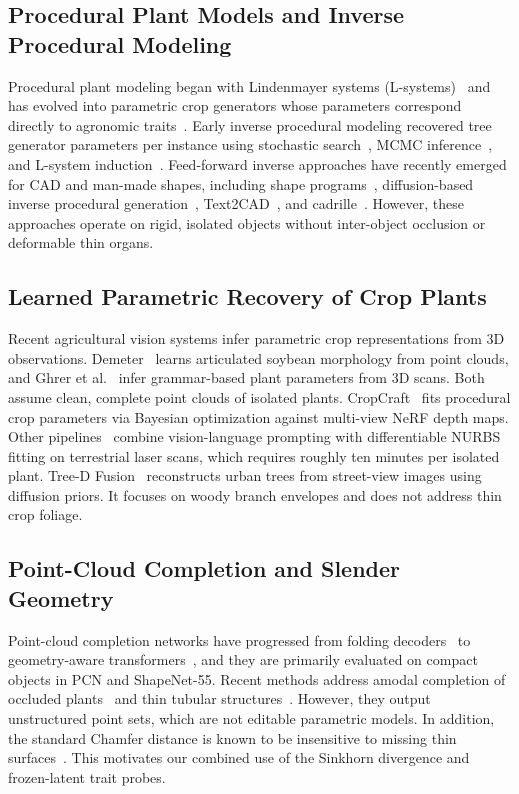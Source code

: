\documentclass[10pt,twocolumn,letterpaper]{article}
\begin{document}
\subsection{Procedural Plant Models and Inverse Procedural Modeling}
Procedural plant modeling began with Lindenmayer systems (L-systems)~\citep{prusin1990abop} and has evolved into parametric crop generators whose parameters correspond directly to agronomic traits~\citep{floraforge2026,hadadi2025procmaize}. Early inverse procedural modeling recovered tree generator parameters per instance using stochastic search~\citep{stava2014ipmtrees}, MCMC inference~\citep{talton2011metropolis}, and L-system induction~\citep{guo2020ipmlsys,latentlsys2023}. Feed-forward inverse approaches have recently emerged for CAD and man-made shapes, including shape programs~\citep{shapeprograms2019}, diffusion-based inverse procedural generation~\citep{zhao2025dipcg}, Text2CAD~\citep{text2cad2024}, and cadrille~\citep{kolodiazhnyi2025cadrille}. However, these approaches operate on rigid, isolated objects without inter-object occlusion or deformable thin organs.

\subsection{Learned Parametric Recovery of Crop Plants}
Recent agricultural vision systems infer parametric crop representations from 3D observations. Demeter~\citep{demeter2025} learns articulated soybean morphology from point clouds, and Ghrer et al.~\citep{ghrer2025paramplants} infer grammar-based plant parameters from 3D scans. Both assume clean, complete point clouds of isolated plants. CropCraft~\citep{cropcraft2026} fits procedural crop parameters via Bayesian optimization against multi-view NeRF depth maps. Other pipelines~\citep{hadadi2026vlmmaize,hadadi2025procmaize,nurbsdiff2022} combine vision-language prompting with differentiable NURBS fitting on terrestrial laser scans, which requires roughly ten minutes per isolated plant. Tree-D Fusion~\citep{lee2024treedfusion} reconstructs urban trees from street-view images using diffusion priors. It focuses on woody branch envelopes and does not address thin crop foliage.

\subsection{Point-Cloud Completion and Slender Geometry}
Point-cloud completion networks have progressed from folding decoders~\citep{yuan2018pcn} to geometry-aware transformers~\citep{yu2021pointr,yu2023adapointr,cai2024einet}, and they are primarily evaluated on compact objects in PCN and ShapeNet-55. Recent methods address amodal completion of occluded plants~\citep{lee2026occ} and thin tubular structures~\citep{curvegaussian2025,qi2026rethinking}. However, they output unstructured point sets, which are not editable parametric models. In addition, the standard Chamfer distance is known to be insensitive to missing thin surfaces~\citep{wu2021dcd,song2026structural,lin2023infocd}. This motivates our combined use of the Sinkhorn divergence and frozen-latent trait probes.
\end{document}
